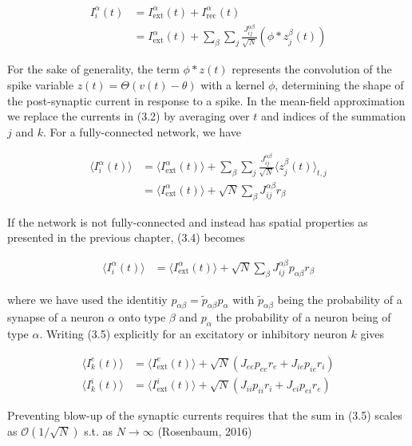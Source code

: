 \documentclass{ucetd}
\begin{document}
\begin{align}
I_{i}^{\alpha}(t) &= I_{\mathrm{ext}}^{\alpha}(t) + I_{\mathrm{rec}}^{\alpha}(t)\\
&= I_{\mathrm{ext}}^{\alpha}(t) + \sum_{\beta}\sum_{j} \frac{J_{ij}^{\alpha\beta}}{\sqrt{N}}(\phi * z^{\beta}_{j}(t))
\end{align}

For the sake of generality, the term $\phi * z(t)$ represents the convolution of the spike variable $z(t) = \Theta(v(t) - \theta)$ with a kernel $\phi$, determining the shape of the post-synaptic current in response to a spike. In the mean-field approximation we replace the currents in (3.2) by averaging over $t$ and indices of the summation $j$ and $k$. For a fully-connected network, we have

\begin{align}
\langle I_{i}^{\alpha}(t)\rangle &= \langle I_{\mathrm{ext}}^{\alpha}(t)\rangle + \sum_{\beta}\sum_{j} \frac{J_{ij}^{\alpha\beta}}{\sqrt{N}}\langle z_{j}^{\beta}(t)\rangle_{t,j}\\
&= \langle I_{\mathrm{ext}}^{\alpha}(t)\rangle + \sqrt{N}\sum_{\beta}J_{ij}^{\alpha\beta} r_{\beta}
\end{align}

If the network is not fully-connected and instead has spatial properties as presented in the previous chapter, (3.4) becomes

\begin{align}
\langle I_{i}^{\alpha}(t)\rangle &= \langle I_{\mathrm{ext}}^{\alpha}(t)\rangle + \sqrt{N}\sum_{\beta}J_{ij}^{\alpha\beta}p_{\alpha\beta}r_{\beta}
\end{align}

where we have used the identitiy $p_{\alpha\beta} = \tilde{p}_{\alpha\beta}p_{\alpha}$ with $\tilde{p}_{\alpha\beta}$ being the probability of a synapse of a neuron $\alpha$ onto type $\beta$ and $p_{\alpha}$ the probability of a neuron being of type $\alpha$. Writing (3.5) explicitly for an excitatory or inhibitory neuron $k$ gives

\begin{align}
\langle I_{k}^{e}(t)\rangle &= \langle I_{\mathrm{ext}}^{e}(t)\rangle + \sqrt{N}\left(J_{ee}p_{ee}r_{e} + J_{ie}p_{ie}r_{i}\right)\\
\langle I_{k}^{i}(t)\rangle &= \langle I_{\mathrm{ext}}^{i}(t)\rangle + \sqrt{N}\left(J_{ii}p_{ii}r_{i} + J_{ei}p_{ei}r_{e}\right)
\end{align}


Preventing blow-up of the synaptic currents requires that the sum in (3.5) scales as $\mathcal{O}\left(1/\sqrt{N}\right)$ s.t. as $N\rightarrow \infty$ (Rosenbaum, 2016)
\end{document}
